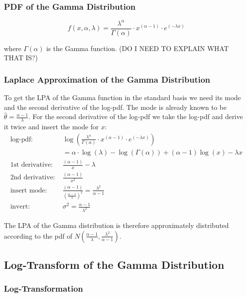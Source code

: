 \documentclass{article}
\begin{document}
\subsubsection{PDF of the Gamma Distribution}

\begin{equation}
	f(x, \alpha, \lambda) = \frac{\lambda^\alpha}{\Gamma(\alpha)} \cdot x^{(\alpha - 1)} \cdot e^{(-\lambda x)}
\end{equation}

where $\Gamma(\alpha)$ is the Gamma function. (DO I NEED TO EXPLAIN WHAT THAT IS?)

\subsubsection{Laplace Approximation of the Gamma Distribution}

To get the LPA of the Gamma function in the standard basis we need its mode and the second derivative of the log-pdf. The mode is already known to be $\hat{\theta} = \frac{\alpha -1}{\lambda}$. For the second derivative of the log-pdf we take the log-pdf and derive it twice and insert the mode for $x$:
\begin{align*}
	\text{log-pdf: } &\log\left( \frac{\lambda^\alpha}{\Gamma(\alpha)} \cdot x^{(\alpha - 1)} \cdot e^{(-\lambda x)}\right) \\
	&= \alpha \cdot \log(\lambda) - \log(\Gamma(\alpha)) + (\alpha -1)\log(x) -\lambda x\\
	\text{1st derivative: }& \frac{(\alpha-1)}{x} - \lambda \\
	\text{2nd derivative: }& \frac{(\alpha-1)}{x^2}\\
	\text{insert mode: }& \frac{(\alpha-1)}{(\frac{\alpha -1}{\lambda})^2} = \frac{\lambda^2}{\alpha - 1} \\
	\text{invert: }&\sigma^2 = \frac{\alpha-1}{\lambda^2}
\end{align*}

The LPA of the Gamma distribution is therefore approximately distributed according to the pdf of $N(\frac{\alpha - 1}{\lambda}, \frac{\lambda^2}{\alpha-1})$.

\subsection{Log-Transform of the Gamma Distribution}

\subsubsection{Log-Transformation}
\end{document}
